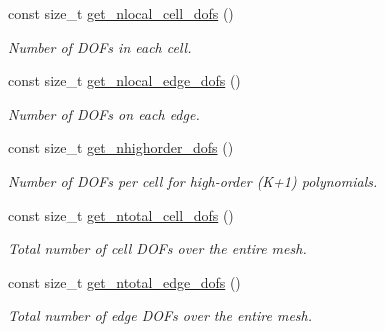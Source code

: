 \begin{DoxyCompactItemize}
\mbox{\label{classHArDCore2D_1_1HHO__Diffusion_a256bb752aa0cfa95590e7fc527df79af}} 
const size\+\_\+t \hyperlink{classHArDCore2D_1_1HHO__Diffusion_a256bb752aa0cfa95590e7fc527df79af}{get\+\_\+nlocal\+\_\+cell\+\_\+dofs} ()
\begin{DoxyCompactList}\small\item\em Number of D\+O\+Fs in each cell. \end{DoxyCompactList}\item 
\mbox{\label{classHArDCore2D_1_1HHO__Diffusion_a11f28c7a5bc9eec0cf98b08bdb522f26}} 
const size\+\_\+t \hyperlink{classHArDCore2D_1_1HHO__Diffusion_a11f28c7a5bc9eec0cf98b08bdb522f26}{get\+\_\+nlocal\+\_\+edge\+\_\+dofs} ()
\begin{DoxyCompactList}\small\item\em Number of D\+O\+Fs on each edge. \end{DoxyCompactList}\item 
\mbox{\label{classHArDCore2D_1_1HHO__Diffusion_adf4594eefb906f71afb354a06242366b}} 
const size\+\_\+t \hyperlink{classHArDCore2D_1_1HHO__Diffusion_adf4594eefb906f71afb354a06242366b}{get\+\_\+nhighorder\+\_\+dofs} ()
\begin{DoxyCompactList}\small\item\em Number of D\+O\+Fs per cell for high-\/order (K+1) polynomials. \end{DoxyCompactList}\item 
\mbox{\label{classHArDCore2D_1_1HHO__Diffusion_ad1d44ea24b4d4bb67e7038958871a142}} 
const size\+\_\+t \hyperlink{classHArDCore2D_1_1HHO__Diffusion_ad1d44ea24b4d4bb67e7038958871a142}{get\+\_\+ntotal\+\_\+cell\+\_\+dofs} ()
\begin{DoxyCompactList}\small\item\em Total number of cell D\+O\+Fs over the entire mesh. \end{DoxyCompactList}\item 
\mbox{\label{classHArDCore2D_1_1HHO__Diffusion_a06eefd287e888b735c2c601c730e9db2}} 
const size\+\_\+t \hyperlink{classHArDCore2D_1_1HHO__Diffusion_a06eefd287e888b735c2c601c730e9db2}{get\+\_\+ntotal\+\_\+edge\+\_\+dofs} ()
\begin{DoxyCompactList}\small\item\em Total number of edge D\+O\+Fs over the entire mesh. \end{DoxyCompactList}\item 

\end{DoxyCompactItemize}
